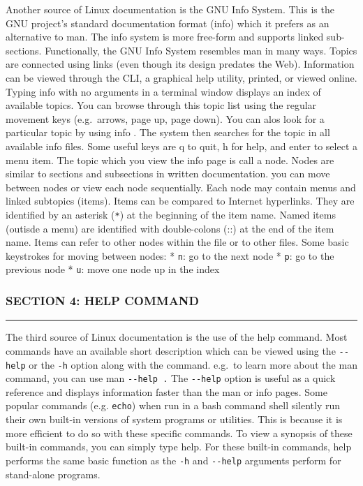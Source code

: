 Another source of Linux documentation is the GNU Info System. This is
the GNU project's standard documentation format (info) which it prefers
as an alternative to man. The info system is more free-form and supports
linked sub-sections. Functionally, the GNU Info System resembles man in
many ways. Topics are connected using links (even though its design
predates the Web). Information can be viewed through the CLI, a
graphical help utility, printed, or viewed online. Typing info with no
arguments in a terminal window displays an index of available topics.
You can browse through this topic list using the regular movement keys
(e.g.~arrows, page up, page down). You can alos look for a particular
topic by using info . The system then searches for the topic in all
available info files. Some useful keys are q to quit, h for help, and
enter to select a menu item. The topic which you view the info page is
call a node. Nodes are similar to sections and subsections in written
documentation. you can move between nodes or view each node
sequentially. Each node may contain menus and linked subtopics (items).
Items can be compared to Internet hyperlinks. They are identified by an
asterisk (\texttt{*}) at the beginning of the item name. Named items
(outisde a menu) are identified with double-colons (::) at the end of
the item name. Items can refer to other nodes within the file or to
other files. Some basic keystrokes for moving between nodes: *
\texttt{n}: go to the next node * \texttt{p}: go to the previous node *
\texttt{u}: move one node up in the index

\subsubsection{SECTION 4: HELP COMMAND}\label{section-4-help-command}

\begin{center}\rule{3in}{0.4pt}\end{center}

The third source of Linux documentation is the use of the help command.
Most commands have an available short description which can be viewed
using the \texttt{-\/-help} or the \texttt{-h} option along with the
command. e.g.~to learn more about the man command, you can use man
\texttt{-\/-help .} The \texttt{-\/-help} option is useful as a quick
reference and displays information faster than the man or info pages.
Some popular commands (e.g. \texttt{echo}) when run in a bash command
shell silently run their own built-in versions of system programs or
utilities. This is because it is more efficient to do so with these
specific commands. To view a synopsis of these built-in commands, you
can simply type help. For these built-in commands, help performs the
same basic function as the \texttt{-h} and \texttt{-\/-help} arguments
perform for stand-alone programs.

